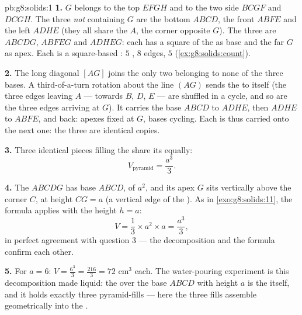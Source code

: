 \begin{solution}{pb:g8:solids:1}
\textbf{1.} $G$ belongs to the top  $EFGH$ and to the two
side  $BCGF$ and $DCGH$. The three  \emph{not}
containing $G$ are the bottom $ABCD$, the front $ABFE$ and the
left  $ADHE$ (they all share the  $A$, the corner
opposite $G$). The three  are $ABCDG$, $ABFEG$ and
$ADHEG$: each has a square  of the  as base and the far
 $G$ as apex. Each is a square-based : $5$ ,
$8$ edges, $5$  (\cref{ex:g8:solids:count}).

\textbf{2.} The long diagonal $[AG]$ joins the only two 
belonging to none of the three bases. A third-of-a-turn rotation
about the line $(AG)$ sends the  to itself (the three edges
leaving $A$ --- towards $B$, $D$, $E$ --- are shuffled in a
cycle, and so are the three edges arriving at $G$). It carries
the base $ABCD$ to $ADHE$, then $ADHE$ to $ABFE$, and back:
apexes fixed at $G$, bases cycling. Each  is thus carried
onto the next one: the three are identical copies.

\textbf{3.} Three identical pieces filling the  share its
 equally:
\[
V_{\text{pyramid}} = \frac{a^3}{3} .
\]

\textbf{4.} The  $ABCDG$ has base $ABCD$, of  $a^2$,
and its apex $G$ sits vertically above the corner $C$, at height
$CG = a$ (a vertical edge of the ). As in
\cref{exo:g8:solids:11}, the formula applies with the
 height $h = a$:
\[
V = \frac13 \times a^2 \times a = \frac{a^3}{3} ,
\]
in perfect agreement with question 3 --- the decomposition and
the formula confirm each other.

\textbf{5.} For $a = 6$:
$V = \frac{6^3}{3} = \frac{216}{3} = 72$ cm$^3$ each. The
water-pouring experiment is this decomposition made liquid: the
 over the base $ABCD$ with height $a$ is the  itself,
and it holds exactly three pyramid-fills --- here the three
fills  assemble geometrically into the .


\end{solution}
